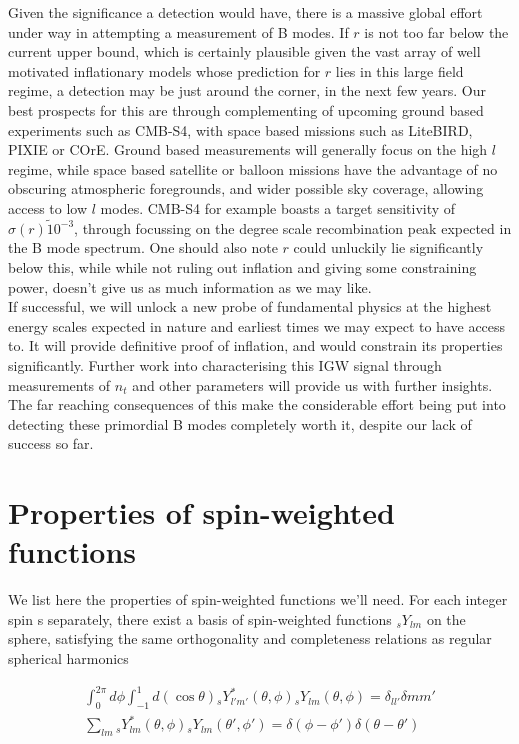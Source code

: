 \documentclass[a4paper,10pt]{article}
\begin{document}
Given the significance a detection would have, there is a massive global effort under way in attempting a measurement of B modes. If $r$ is not too far below the current upper bound, which is certainly plausible given the vast array of well motivated inflationary models whose prediction for $r$ lies in this large field regime, a detection may be just around the corner, in the next few years. Our best prospects for this are through complementing of upcoming ground based experiments such as CMB-S4, with space based missions such as LiteBIRD, PIXIE or COrE. Ground based measurements will generally focus on the high $l$ regime, while space based satellite or balloon missions have the advantage of no obscuring atmospheric foregrounds, and wider possible sky coverage, allowing access to low $l$ modes. CMB-S4 for example boasts a target sensitivity of $\sigma(r) \tilde 10^{-3}$, through focussing on the degree scale recombination peak expected in the B mode spectrum. One should also note $r$ could unluckily lie significantly below this, while while not ruling out inflation and giving some constraining power, doesn't give us as much information as we may like.\\

If successful, we will unlock a new probe of fundamental physics at the highest energy scales expected in nature and earliest times we may expect to have access to. It will provide definitive proof of inflation, and would constrain its properties significantly. Further work into characterising this IGW signal through measurements of $n_t$ and other parameters will provide us with further insights. The far reaching consequences of this make the considerable effort being put into detecting these primordial B modes completely worth it, despite our lack of success so far. 


\newpage

\appendix

\section{Properties of spin-weighted functions}
\label{swf}

We list here the properties of spin-weighted functions we'll need. For each integer spin s separately, there exist a basis of spin-weighted functions $_sY_{lm}$ on the sphere, satisfying the same orthogonality and completeness relations as regular spherical harmonics

\begin{equation}
\begin{split}
\int_0^{2\pi} d\phi \int_{-1}^{1} d(\cos{\theta}) {}_sY_{l'm'}^*(\theta,\phi){}_sY_{lm}(\theta,\phi) = \delta_{ll'}\delta{mm'} \\
\sum_{lm} {}_sY_{lm}^*(\theta,\phi){}_sY_{lm}(\theta',\phi')=\delta(\phi-\phi')\delta(\theta-\theta')
\end{split}
\end{equation}
\end{document}
